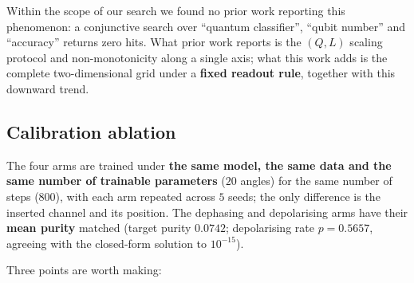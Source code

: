 \documentclass{article}
\begin{document}
Within the scope of our search we found no prior work reporting this
phenomenon: a conjunctive search over ``quantum classifier'', ``qubit
number'' and ``accuracy'' returns zero hits. What prior work reports is
the \((Q,L)\) scaling protocol and non-monotonicity along a single axis;
what this work adds is the complete two-dimensional grid under a
\textbf{fixed readout rule}, together with this downward trend.

\subsection{Calibration ablation}

The four arms are trained under \textbf{the same model, the same data
and the same number of trainable parameters} (\(20\) angles) for the
same number of steps (\(800\)), with each arm repeated across \(5\)
seeds; the only difference is the inserted channel and its position. The
dephasing and depolarising arms have their \textbf{mean purity} matched
(target purity \(0.0742\); depolarising rate \(p = 0.5657\), agreeing
with the closed-form solution to \(10^{- 15}\)).

\begin{table}[t]
\centering
\caption{Calibration ablation. Arm C is bit-for-bit identical to arm A
on every predictive metric, yet its state purity is \(0.1230\) against
\(1.0000\): a computational-basis measurement reads only the diagonal
entries, so dephasing at the end of the circuit changes the state but no
observable outcome.}
\end{table}


Three points are worth making:
\end{document}
